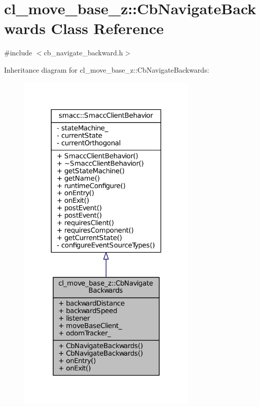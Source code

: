 \hypertarget{classcl__move__base__z_1_1CbNavigateBackwards}{}\section{cl\+\_\+move\+\_\+base\+\_\+z\+:\+:Cb\+Navigate\+Backwards Class Reference}
\label{classcl__move__base__z_1_1CbNavigateBackwards}


{\ttfamily \#include $<$cb\+\_\+navigate\+\_\+backward.\+h$>$}



Inheritance diagram for cl\+\_\+move\+\_\+base\+\_\+z\+:\+:Cb\+Navigate\+Backwards\+:
\nopagebreak
\begin{figure}[H]
\begin{center}
\leavevmode
\includegraphics[width=242pt]{classcl__move__base__z_1_1CbNavigateBackwards__inherit__graph}
\end{center}
\end{figure}


